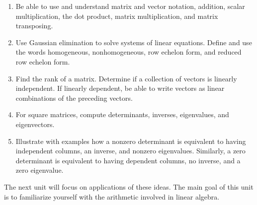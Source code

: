 
\begin{enumerate}

\item Be able to use and understand matrix and vector notation, addition, scalar multiplication, the dot product, matrix multiplication, and matrix transposing. 
\item Use Gaussian elimination to solve systems of linear equations. Define and use the words homogeneous, nonhomogeneous, row echelon form, and reduced row echelon form. 
\item Find the rank of a matrix. Determine if a collection of vectors is linearly independent. If linearly dependent, be able to write vectors as linear combinations of the preceding vectors.
\item For square matrices, compute determinants, inverses, eigenvalues, and eigenvectors. 
\item Illustrate with examples how a nonzero determinant is equivalent to having independent columns, an inverse, and nonzero eigenvalues. Similarly, a zero determinant is equivalent to having dependent columns, no inverse, and a zero eigenvalue. 

\end{enumerate}

The next unit will focus on applications of these ideas. The main goal of this unit is to familiarize yourself with the arithmetic involved in linear algebra.
